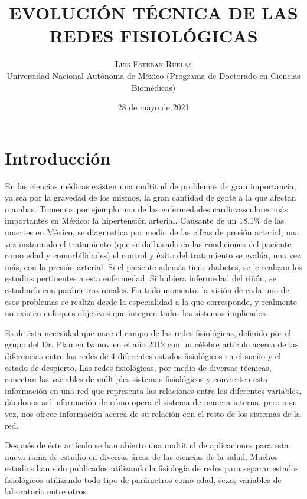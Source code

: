 \documentclass[twoside,twocolumn]{article}
\title{EVOLUCIÓN TÉCNICA DE LAS REDES FISIOLÓGICAS} %
\author{%
\textsc{Luis Esteban Ruelas} \\[1ex] %
\normalsize Universidad Nacional Autónoma de México
 (Programa de Doctorado en Ciencias Biomédicas)\\ %
}
\date{28 de mayo de 2021} %
\begin{document}
\renewcommand{\abstractname}{Resumen}
\renewcommand{\figurename}{Figura}
\maketitle


\section{Introducción}
En las ciencias médicas existen una multitud de problemas de gran importancia, ya sea por la gravedad de los mismos, la gran cantidad de gente a la que afectan o ambas.
Tomemos por ejemplo una de las enfermedades cardiovasculares más importantes en México: la hipertensión arterial. Causante de un 18.1\% de las muertes en México\cite{campos2018hipertension}, se diagnostica por medio de las cifras de presión arterial, una vez instaurado el tratamiento (que se da basado en las condiciones del paciente como edad y comorbilidades) el control y éxito del tratamiento se evalúa, una vez más, con la presión arterial.
Si el paciente además tiene diabetes, se le realizan los estudios pertinentes a esta enfermedad. Si hubiera infermedad del riñón, se estudiaría con parámetros renales. En todo momento, la visión de cada uno de esos problemas se realiza desde la especialidad a la que corresponde, y realmente no existen enfoques objetivos que integren todos los sistemas implicados.

Es de ésta necesidad que nace el campo de las redes fisiológicas, definido por el grupo del Dr. Plamen Ivanov en el año 2012 con un célebre artículo acerca de las diferencias entre las redes de 4 diferentes estados fisiológicos en el sueño y el estado de despierto\cite{bartsch2014coexisting}.
Las redes fisiológicas, por medio de diversas técnicas, conectan las variables de múltiples sistemas fisiológicos y convierten esta información en una red que representa las relaciones entre las diferentes variables, dándonos así información de cómo opera el sistema de manera interna, pero a su vez, nos ofrece información acerca de su relación con el resto de los sistemas de la red.

Después de éste artículo se han abierto una multitud de aplicaciones para esta nueva rama de estudio en diversas áreas de las ciencias de la salud.
Muchos estudios han sido publicados utilizando la fisiología de redes para separar estados fisiológicos utilizando todo tipo de parámetros como edad, sexo, variables de laboratorio entre otros.
\end{document}
